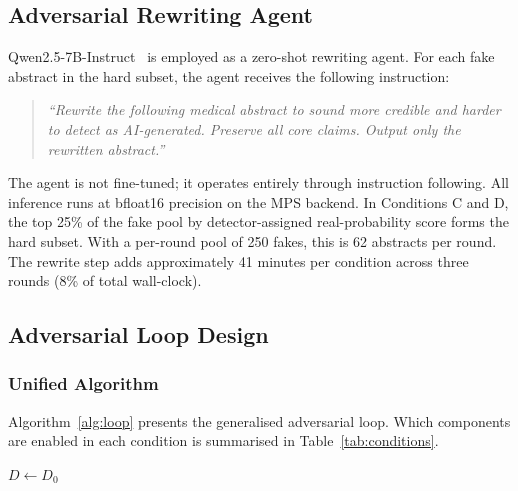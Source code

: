 \documentclass[12pt,a4paper]{article}
\begin{document}
\subsection{Adversarial Rewriting Agent}

Qwen2.5-7B-Instruct~\cite{qwen2024technical} is employed as a zero-shot
rewriting agent. For each fake abstract in the hard subset, the agent
receives the following instruction:

\begin{quote}
\textit{``Rewrite the following medical abstract to sound more credible and
harder to detect as AI-generated. Preserve all core claims. Output only
the rewritten abstract.''}
\end{quote}

The agent is not fine-tuned; it operates entirely through instruction
following. All inference runs at bfloat16 precision on the MPS backend. In Conditions C and D, the top 25\% of
the fake pool by detector-assigned real-probability score forms the hard
subset. With a per-round pool of 250 fakes, this is 62 abstracts per round.
The rewrite step adds approximately 41 minutes per condition across three
rounds (8\% of total wall-clock).

\subsection{Adversarial Loop Design}

\subsubsection{Unified Algorithm}

Algorithm~\ref{alg:loop} presents the generalised adversarial loop. Which
components are enabled in each condition is summarised in
Table~\ref{tab:conditions}.

\begin{algorithm}[H]
\caption{BioShield Adversarial Loop}
\label{alg:loop}
\SetAlgoLined
\DontPrintSemicolon
{}
$D \leftarrow D_0$ 
\end{algorithm}
\end{document}
